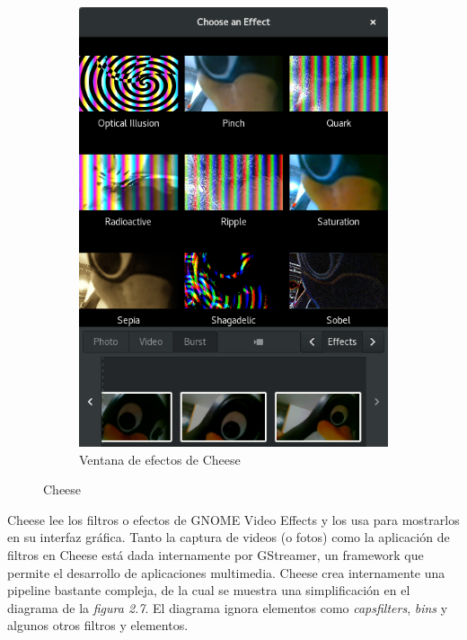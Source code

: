 \documentclass[a4paper,openright,12pt]{report}
\begin{document}
\begin{figure}
\begin{subfigure}{0.4\textwidth}
  \includegraphics[width=\textwidth]{../images/cheese-effects-grid.png}
  \caption{Ventana de efectos de Cheese}
\end{subfigure}
\caption[Hello]{Cheese}
\end{figure}

Cheese lee los filtros o efectos de GNOME Video Effects y los usa para
mostrarlos en su interfaz gráfica. Tanto la captura de videos (o fotos) como la
aplicación de filtros en Cheese está dada internamente por GStreamer, un
framework que permite el desarrollo de aplicaciones multimedia. Cheese crea
internamente una pipeline bastante compleja, de la cual se muestra una
simplificación en el diagrama de la \textit{figura 2.7}. El diagrama ignora
elementos como \textit{capsfilters}, \textit{bins} y algunos otros filtros y
elementos.
\end{document}
